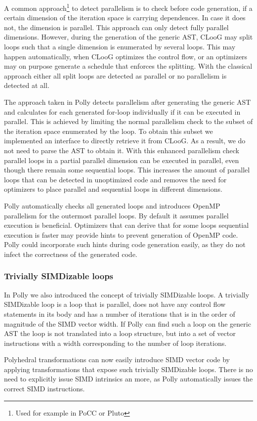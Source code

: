 A common approach\footnote{Used for example in PoCC or Pluto} to detect
parallelism is to check before code generation, if a certain dimension of the
iteration space is carrying dependences. In case it does not, the dimension is
parallel.  This approach can only detect fully parallel dimensions. However,
during the generation of the generic AST, CLooG may split loops such that a
single dimension is enumerated by several loops.  This may happen
automatically, when CLooG optimizes the control flow, or an optimizers may on
purpose generate a schedule that enforces the splitting.  With the classical
approach either all split loops are detected as parallel or no parallelism is
detected at all.

The approach taken in Polly detects parallelism after generating the generic
AST and calculates for each generated for-loop individually if it can be
executed in parallel. This is achieved by limiting the normal parallelism check
to the subset of the iteration space enumerated by the loop. To obtain this subset
we implemented an interface to directly retrieve it from CLooG. As a result,
we do not need to parse the AST to obtain it. With this enhanced parallelism
check parallel loops in a partial parallel dimension can be executed in
parallel, even though there remain some sequential loops. This increases the
amount of parallel loops that can be detected in unoptimized code and removes
the need for optimizers to place parallel and sequential loops in different
dimensions.

Polly automatically checks all generated loops and introduces OpenMP
parallelism for the outermost parallel loops. By default it assumes parallel
execution is beneficial. Optimizers that can derive that for some loops
sequential execution is faster may provide hints to prevent generation of
OpenMP code. Polly could incorporate such hints during code generation easily,
as they do not infect the correctness of the generated code.


\subsubsection{Trivially SIMDizable loops}
In Polly we also introduced the concept of trivially SIMDizable loops. A
trivially SIMDizable loop is a loop that is parallel, does not have any control
flow statements in its body and has a number of iterations that is in the order of
magnitude of the SIMD vector width. If Polly can find such a loop on the generic AST
the loop is not translated into a loop structure, but into a set of vector
instructions with a width corresponding to the number of loop iterations.

Polyhedral transformations can now easily introduce SIMD vector code by applying
transformations that expose such trivially SIMDizable loops. There is no need
to explicitly issue SIMD intrinsics an more, as Polly automatically issues the
correct SIMD instructions.

